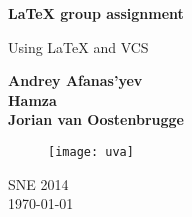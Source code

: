 \begin{titlepage}
    \begin{center}
        \vspace*{4cm}
        
        \LARGE
        \textbf{\LaTeX{} group assignment}
        
        \vspace{0.5cm}
        \large
        Using \LaTeX{} and VCS
        
        \vspace{1.5cm}
        
	\textbf{Andrey Afanas'yev}
	\\
	\textbf{Hamza}
	\\
	 \textbf{Jorian van Oostenbrugge}
	
	\vspace{4.5cm}
	
	\begin{figure}[H]
    		\centering
    		\texttt{[image: uva]}
	\end{figure}
        
        \vfill
        
        \vspace{0.8cm}
	SNE 2014
	\\
        \today
        
    \end{center}
\end{titlepage}
